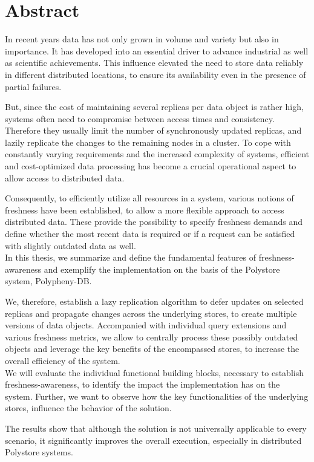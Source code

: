\chapter{Abstract}

In recent years data has not only grown in volume and variety but also in importance.
It has developed into an essential driver to advance industrial as well as scientific achievements.
This influence elevated the need to store data reliably in different distributed locations,
to ensure its availability even in the presence of partial failures.

But, since the cost of maintaining several replicas per data object
is rather high, systems often need to compromise between access times and consistency.
Therefore they usually limit the number of synchronously updated replicas, and lazily replicate
the changes to the remaining nodes in a cluster.
To cope with constantly varying requirements and the increased complexity of systems,
efficient and cost-optimized data processing has become a crucial operational aspect 
to allow access to distributed data.

Consequently, to efficiently utilize all resources in a system, 
various notions of freshness have been established, to allow a more flexible approach to
access distributed data.
These provide the possibility to specify freshness demands and define whether
the most recent data is required or if a request can be satisfied with slightly outdated data as well.\\


In this thesis, we summarize and define the fundamental features of freshness-awareness and exemplify the 
implementation on the basis of the Polystore system, Polypheny-DB.

We, therefore, establish a lazy replication algorithm to defer updates on selected replicas
and propagate changes across the underlying stores, to create multiple versions of 
data objects.
Accompanied with individual query extensions and various freshness metrics, we allow to centrally process 
these possibly outdated objects and leverage the key benefits of the encompassed stores,
to increase the overall efficiency of the system.\\

We will evaluate the individual functional building blocks, necessary to establish freshness-awareness,
to identify the impact the implementation has on the system. Further, we want to observe how the
key functionalities of the underlying stores, influence the behavior of the solution.

The results show that although the solution is not 
universally applicable to every scenario, it significantly improves 
the overall execution, especially in distributed Polystore systems.